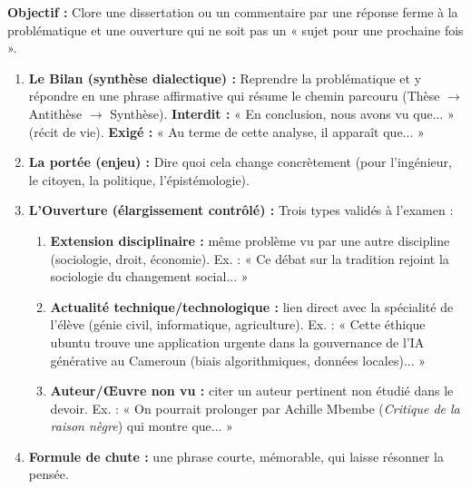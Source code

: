 \documentclass[11pt]{article}
\newcommand{\cle}[1]{{\popxbold\color{popdark}#1}}
\begin{document}
\begin{methode}
\textbf{Objectif :} Clore une dissertation ou un commentaire par une réponse ferme à la problématique et une ouverture qui ne soit pas un « sujet pour une prochaine fois ».
\begin{enumerate}
    \item \textbf{Le Bilan (synthèse dialectique) :} Reprendre la \cle{problématique} et y répondre en une phrase affirmative qui résume le chemin parcouru (Thèse $\rightarrow$ Antithèse $\rightarrow$ Synthèse). \textbf{Interdit :} « En conclusion, nous avons vu que... » (récit de vie). \textbf{Exigé :} « Au terme de cette analyse, il apparaît que... »
    \item \textbf{La portée (enjeu) :} Dire \cle{quoi} cela change concrètement (pour l'ingénieur, le citoyen, la politique, l'épistémologie).
    \item \textbf{L'Ouverture (élargissement contrôlé) :} Trois types validés à l'examen :
        \begin{enumerate}
            \item \textbf{Extension disciplinaire :} même problème vu par une autre discipline (sociologie, droit, économie). Ex. : « Ce débat sur la tradition rejoint la sociologie du changement social... »
            \item \textbf{Actualité technique/technologique :} lien direct avec la spécialité de l'élève (génie civil, informatique, agriculture). Ex. : « Cette éthique ubuntu trouve une application urgente dans la gouvernance de l'IA générative au Cameroun (biais algorithmiques, données locales)... »
            \item \textbf{Auteur/Œuvre non vu :} citer un auteur pertinent non étudié dans le devoir. Ex. : « On pourrait prolonger par Achille Mbembe (\emph{Critique de la raison nègre}) qui montre que... »
        \end{enumerate}
    \item \textbf{Formule de chute :} une phrase courte, mémorable, qui laisse résonner la pensée.
\end{enumerate}
\end{methode}
\end{document}
